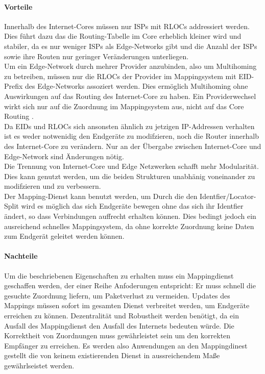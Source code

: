 \paragraph{Vorteile}
Innerhalb des Internet-Cores müssen nur ISPs mit RLOCs addressiert werden. Dies führt dazu das die Routing-Tabelle im Core erheblich kleiner wird und stabiler, da es nur weniger ISPs als Edge-Networks gibt und die Anzahl der ISPs sowie ihre Routen nur geringer Veränderungen unterliegen. \cite{jen:2008:start} \cite{deering:1996:map} \\
Um ein Edge-Network durch mehrer Provider anzubinden, also um Multihoming zu betreiben, müssen nur die RLOCs der Provider im Mappingsystem mit EID-Prefix des Edge-Networks assoziert werden. Dies ermöglich Multihoming ohne Auswirkungen auf das Routing des Internet-Core zu haben. Ein Providerwechsel wirkt sich nur auf die Zuordnung im  Mappingsystem aus, nicht auf das Core Routing \cite{farinacci2007internet}.\\
Da EIDs und RLOCs sich ansonsten ähnlich zu jetzigen IP-Addressen verhalten ist es weder notwenidig den Endgeräte zu modifzieren, noch die Router innerhalb des Internet-Core zu verändern. Nur an der Übergabe zwischen Internet-Core und Edge-Network sind Änderungen nötig. \cite{jen:2008:start} \\
Die Trennung von Internet-Core und Edge Netzwerken schafft mehr Modularität. Dies kann genutzt werden, um die beiden Strukturen unabhänig voneinander zu modifzieren und zu verbessern.\\
Der Mapping-Dienst kann benutzt werden, um 
Durch die den Identfier/Locator-Split wird es möglich das sich Endgeräte bewegen ohne das sich ihr Identfier ändert, so dass Verbindungen auffrecht erhalten können. Dies bedingt jedoch ein ausreichend schnelles Mappingsystem, da ohne korrekte Zuordnung keine Daten zum Endgerät geleitet werden können. \\

\paragraph{Nachteile}
Um die beschriebenen Eigenschaften zu erhalten muss ein Mappingdienst geschaffen werden, der einer Reihe Anfoderungen entspricht: Er muss schnell die gesuchte Zuordnung liefern, um Paketverlust zu vermeiden. Updates des Mappings müssen sofort im gesamten Dienst verbreitet werden, um Endgeräte erreichen zu können. Dezentralität und Robustheit werden benötigt, da ein Ausfall des Mappingdienst den Ausfall des Internets bedeuten würde. Die Korrektheit von Zuordnungen muss gewährleistet sein um den korrekten Empfänger zu erreichen. Es werden also Anwendungen an den Mappingdinest gestellt die von keinem existierenden Dienst in aussreichendem Maße gewährlseistet werden.

